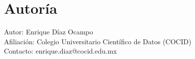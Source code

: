 \section*{Autoría}
Autor: Enrique Díaz Ocampo\\
Afiliación: Colegio Universitario Científico de Datos (COCID)\\
Contacto: enrique.diaz@cocid.edu.mx
